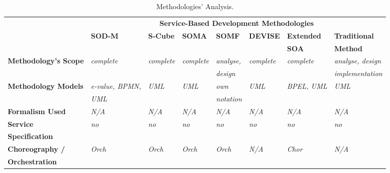 \begin{table}
\caption{Methodologies' Analysis.} %
\label{tab:method_analysis}
\begin{tabular}{l|l|l|l|l|l|l|l|l} 
\hline 
\hline

\multicolumn{2}{l|}{\multirow{2}{*}{}} &
\multicolumn{7}{|c}{\textbf{Service-Based Development Methodologies}} \\ \cline{3-9}

\multicolumn{2}{l|}{} & \textbf{SOD-M \cite{valeriaThesis}} & \textbf{S-Cube
\cite{scube2010book}} & \textbf{SOMA \cite{soma}} & \textbf{SOMF \cite{somf}} &
\textbf{DEVISE \cite{DEVISE}} & \textbf{Extended}
& \textbf{Traditional} \\
\multicolumn{2}{l|}{} &  &  &  &  &
 & \textbf{SOA \cite{PapazoglouH06}}
& \textbf{Method \cite{sommerville08}} \\
\hline
 
\multicolumn{2}{l|}{ \textbf{ Methodology's Scope}} & \textit{complete} &
 \textit{complete} & \textit{complete} & \textit{analyse,} & \textit{complete} &
 \textit{complete} &  \textit{analyse, design} \\
 
 \multicolumn{2}{l|}{} &  &  & & \textit{design} & & & 
 \textit{implementation} \\
 
 \hline
 
 \multicolumn{2}{l|}{\textbf{Methodology Models}} & \textit{e-value,
 BPMN,}  & \textit{UML} &\textit{UML} & \textit{own} &  \textit{UML} &  \textit{BPEL, UML} & 
 \textit{UML} \\ 
 \multicolumn{2}{l|}{} & \textit{UML}  &  & & \textit{notation} & & & \\

 \hline
 
 \multicolumn{2}{l|}{\textbf{ Formalism Used}} & \textit{N/A}  &
 \textit{N/A} &\textit{N/A} & \textit{N/A} &  \textit{N/A} &  \textit{N/A} & 
 \textit{N/A} \\ 
 
 \hline
 
\multicolumn{2}{l|}{ \textbf{Service}} & \textit{no}  & \textit{no}
 &\textit{no} & \textit{no} &  \textit{no} &  \textit{no} & 
 \textit{no} \\
\multicolumn{2}{l|}{\textbf{Specification}} &  & & &  &   &   & \\ 

\hline

\multicolumn{2}{l|}{ \textbf{Choreography /}} & \textit{Orch}  &
\textit{Orch} &\textit{Orch} & \textit{Orch} &  \textit{N/A} &  \textit{Chor} & 
 \textit{N/A} \\
\multicolumn{2}{l|}{\textbf{Orchestration}} &  & & &  &   &   & \\ 


\end{tabular}
\end{table}

